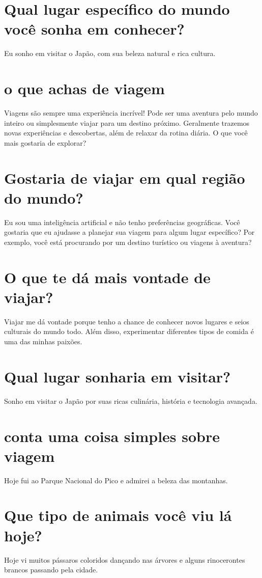 \documentclass[11pt,a4paper]{article}
\begin{document}
\section{Qual lugar específico do mundo você sonha em conhecer?}
Eu sonho em visitar o Japão, com sua beleza natural e rica cultura.

\section{o que achas de viagem}
Viagens são sempre uma experiência incrível! Pode ser uma aventura pelo mundo inteiro ou simplesmente viajar para um destino próximo. Geralmente trazemos novas experiências e descobertas, além de relaxar da rotina diária. O que você mais gostaria de explorar?

\section{Gostaria de viajar em qual região do mundo?}
Eu sou uma inteligência artificial e não tenho preferências geográficas. Você gostaria que eu ajudasse a planejar sua viagem para algum lugar específico? Por exemplo, você está procurando por um destino turístico ou viagens à aventura?

\section{O que te dá mais vontade de viajar?}
Viajar me dá vontade porque tenho a chance de conhecer novos lugares e seios culturais do mundo todo. Além disso, experimentar diferentes tipos de comida é uma das minhas paixões.

\section{Qual lugar sonharia em visitar?}
Sonho em visitar o Japão por suas ricas culinária, história e tecnologia avançada.

\section{conta uma coisa simples sobre viagem}
Hoje fui ao Parque Nacional do Pico e admirei a beleza das montanhas.

\section{Que tipo de animais você viu lá hoje?}
Hoje vi muitos pássaros coloridos dançando nas árvores e alguns rinocerontes brancos passando pela cidade.
\end{document}
